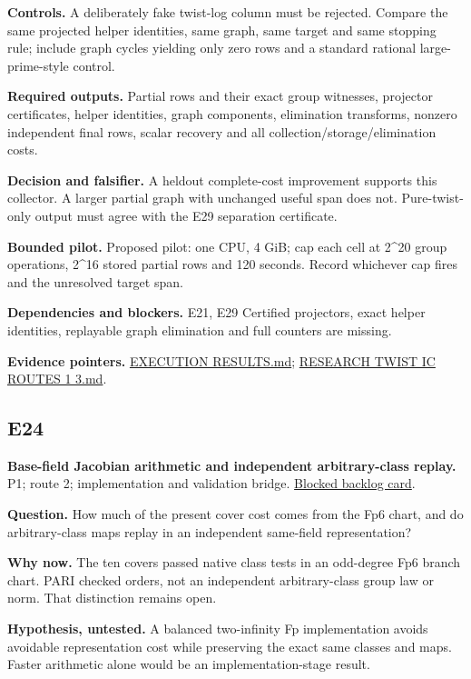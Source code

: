 \documentclass[
  10pt,
]{article}
\begin{document}
\textbf{Controls.} A deliberately fake twist-log column must be
rejected. Compare the same projected helper identities, same graph, same
target and same stopping rule; include graph cycles yielding only zero
rows and a standard rational large-prime-style control.

\textbf{Required outputs.} Partial rows and their exact group witnesses,
projector certificates, helper identities, graph components, elimination
transforms, nonzero independent final rows, scalar recovery and all
collection/storage/elimination costs.

\textbf{Decision and falsifier.} A heldout complete-cost improvement
supports this collector. A larger partial graph with unchanged useful
span does not. Pure-twist-only output must agree with the E29 separation
certificate.

\textbf{Bounded pilot.} Proposed pilot: one CPU, 4 GiB; cap each cell at
2\^{}20 group operations, 2\^{}16 stored partial rows and 120 seconds.
Record whichever cap fires and the unresolved target span.

\textbf{Dependencies and blockers.} E21, E29 Certified projectors, exact
helper identities, replayable graph elimination and full counters are
missing.

\textbf{Evidence pointers.}
\href{../../../research/twist_routes_1_3_20261021/reports/EXECUTION_RESULTS.md}{EXECUTION
RESULTS.md};
\href{../../../research/notes/index-calculus/RESEARCH_TWIST_IC_ROUTES_1_3.md}{RESEARCH
TWIST IC ROUTES 1 3.md}.

\subsection{E24}\label{e24}

\textbf{Base-field Jacobian arithmetic and independent arbitrary-class
replay.} P1; route 2; implementation and validation bridge.
\href{../../../backlog/XP-20261022-twist-base-field-jacobian/README.md}{Blocked
backlog card}.

\textbf{Question.} How much of the present cover cost comes from the Fp6
chart, and do arbitrary-class maps replay in an independent same-field
representation?

\textbf{Why now.} The ten covers passed native class tests in an
odd-degree Fp6 branch chart. PARI checked orders, not an independent
arbitrary-class group law or norm. That distinction remains open.

\textbf{Hypothesis, untested.} A balanced two-infinity Fp implementation
avoids avoidable representation cost while preserving the exact same
classes and maps. Faster arithmetic alone would be an
implementation-stage result.
\end{document}
